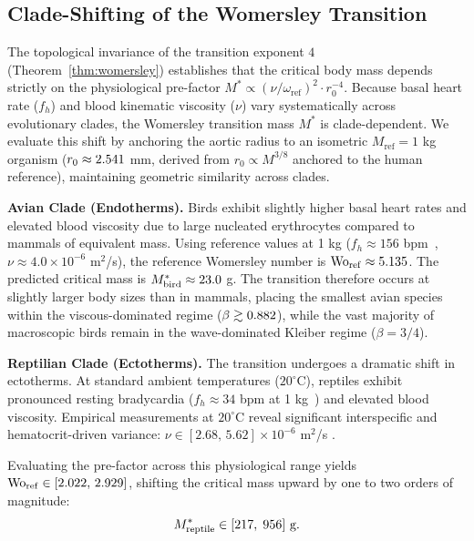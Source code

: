 \documentclass[11pt,a4paper]{article}
\theoremstyle{remark}
\begin{document}
\subsection{Clade-Shifting of the Womersley Transition}
\label{sec:clade_shifting}

The topological invariance of the transition exponent $4$ (Theorem~\ref{thm:womersley})
establishes that the critical body mass depends strictly on the
physiological pre-factor
$M^* \propto (\nu/\omega_{\mathrm{ref}})^2 \cdot r_0^{-4}$.
Because basal heart rate ($f_h$) and blood kinematic viscosity ($\nu$) vary
systematically across evolutionary clades, the Womersley transition mass
$M^*$ is clade-dependent. We evaluate this shift by anchoring the aortic
radius to an isometric $M_{\mathrm{ref}} = 1$ kg organism
($r_0 \approx 2.541{}$ mm, derived from $r_0 \propto M^{3/8}$
anchored to the human reference), maintaining geometric similarity across
clades.

\textbf{Avian Clade (Endotherms).} Birds exhibit slightly higher basal
heart rates and elevated blood viscosity due to large nucleated erythrocytes
compared to mammals of equivalent mass. Using reference values at 1 kg
($f_h \approx 156$ bpm~\cite{calder1968,grubb1983},
$\nu \approx 4.0 \times 10^{-6}$ m$^2$/s), the reference Womersley number
is $\mathrm{Wo}_{\mathrm{ref}} \approx 5.135{}$. The predicted
critical mass is $M^*_{\mathrm{bird}} \approx 23.0{}$ g. The
transition therefore occurs at slightly larger body sizes than in mammals,
placing the smallest avian species within the viscous-dominated regime
($\beta \gtrsim 0.882{}$), while the vast majority of
macroscopic birds remain in the wave-dominated Kleiber regime
($\beta = 3/4$).

\textbf{Reptilian Clade (Ectotherms).} The transition undergoes a dramatic
shift in ectotherms. At standard ambient temperatures ($20^\circ$C),
reptiles exhibit pronounced resting bradycardia
($f_h \approx 34$ bpm at 1 kg~\cite{white1976}) and elevated blood
viscosity. Empirical measurements at $20^\circ$C reveal significant
interspecific and hematocrit-driven variance:
$\nu \in [2.68,\,5.62] \times 10^{-6}$ m$^2$/s
\cite{langille1980,dunlap2006}.

Evaluating the pre-factor across this physiological range yields
$\mathrm{Wo}_{\mathrm{ref}} \in [2.022{},\, 2.929{}]$,
shifting the critical mass upward by one to two orders of magnitude:
\begin{equation}
    M^*_{\mathrm{reptile}} \in [217{},\; 956{}]
    \text{ g.}
    \label{eq:mstar_reptile}
\end{equation}
\end{document}
